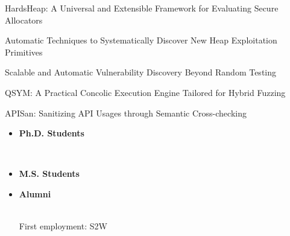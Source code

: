 \documentclass[11pt,letterpaper]{article}
\begin{document}
\begin{centry}{HardsHeap: A Universal and Extensible Framework for Evaluating Secure Allocators}{}
\end{centry}

\begin{centry}{Automatic Techniques to Systematically Discover New Heap Exploitation Primitives}{}
\end{centry}

\begin{centry}{Scalable and Automatic Vulnerability Discovery Beyond Random Testing}{}
\end{centry}

\begin{centry}{QSYM: A Practical Concolic Execution Engine Tailored for Hybrid Fuzzing}{}
\end{centry}

\begin{centry}{APISan: Sanitizing API Usages through Semantic Cross-checking}{}
\end{centry}

\begin{itemize}
  \item \textbf{Ph.D. Students}
    \begin{centry}{}{}
       \\
    \end{centry}

  \item \textbf{M.S. Students}
    \begin{centry}{}{}
    \end{centry}

  \item \textbf{Alumni}
    \begin{centry}{}{}
       \\
      First employment: S2W
    \end{centry}
\end{itemize}
\end{document}
